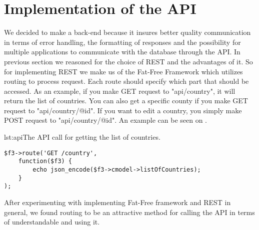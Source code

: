 \section{Implementation of the API}
We decided to make a back-end because it insures better quality communication in terms of error handling, the formatting of responses and the possibility for multiple applications to communicate with the database through the API. In previous section we reasoned for the choice of REST and the advantages of it. So for implementing REST we make us of the Fat-Free Framework which utilizes routing to process request. Each route should specify which part that should be accessed. As an example, if you make GET request to "api/country", it will return the list of countries. You can also get a specific county if you make GET request to "api/country/@id". If you want to edit a country, you simply make POST request to "api/country/@id". An example can be seen on .

\begin{code}{lst:api}{The API call for getting the list of countries.}
\begin{lstlisting}
$f3->route('GET /country',
    function($f3) {
        echo json_encode($f3->cmodel->listOfCountries);
    }
);
\end{lstlisting}
\end{code}

After experimenting with implementing Fat-Free framework and REST in general, we found routing to be an attractive method for calling the API in terms of understandable and using it.